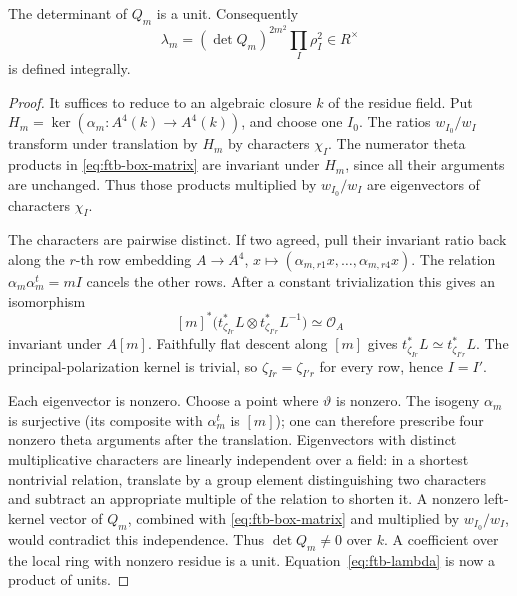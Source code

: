 \begin{srlemma}
\label{lem:ftb-box-det-unit}
The determinant of \(Q_m\) is a unit.  Consequently
\[
        \lambda_m=(\det Q_m)^{2m^2}\prod_I\rho_I^2
                         \in R^\times              \tag{K10}\label{eq:ftb-lambda}
\]
is defined integrally.
\end{srlemma}
\begin{proof}
It suffices to reduce to an algebraic closure \(k\) of the residue
field.  Put \(H_m=\ker(\alpha_m:A^4(k)\to A^4(k))\), and choose
one \(I_0\).  The ratios \(w_{I_0}/w_I\) transform under translation
by \(H_m\) by characters \(\chi_I\).  The numerator theta products
in \eqref{eq:ftb-box-matrix} are invariant under \(H_m\), since
all their arguments are unchanged.  Thus those products multiplied
by \(w_{I_0}/w_I\) are eigenvectors of characters \(\chi_I\).

The characters are pairwise distinct.  If two agreed, pull their
invariant ratio back along the \(r\)-th row embedding
\(A\to A^4\), \(x\mapsto(\alpha_{m,r1}x,\ldots,\alpha_{m,r4}x)\).
The relation \(\alpha_m\alpha_m^t=mI\) cancels the other rows.
After a constant trivialization this gives an isomorphism
\[
 [m]^*\bigl(t_{\zeta_{Ir}}^*L\otimes
                     t_{\zeta_{I'r}}^*L^{-1}\bigr)\simeq\mathcal O_A
\]
invariant under \(A[m]\).
Faithfully flat descent along \([m]\) gives
\(t_{\zeta_{Ir}}^*L\simeq t_{\zeta_{I'r}}^*L\).
The principal-polarization kernel is trivial, so
\(\zeta_{Ir}=\zeta_{I'r}\) for every row, hence \(I=I'\).

Each eigenvector is nonzero.  Choose a point where \(\vartheta\)
is nonzero.  The isogeny \(\alpha_m\) is surjective (its composite
with \(\alpha_m^t\) is \([m]\)); one can therefore prescribe four
nonzero theta arguments after the translation.
Eigenvectors with distinct multiplicative characters are linearly
independent over a field: in a shortest nontrivial relation,
translate by a group element distinguishing two characters and
subtract an appropriate multiple of the relation to shorten it.
A nonzero left-kernel vector of \(Q_m\), combined with
\eqref{eq:ftb-box-matrix} and multiplied by \(w_{I_0}/w_I\), would
contradict this independence.  Thus \(\det Q_m\ne0\) over \(k\).
A coefficient over the local ring with nonzero residue is a unit.
Equation~\eqref{eq:ftb-lambda} is now a product of units.
\end{proof}

